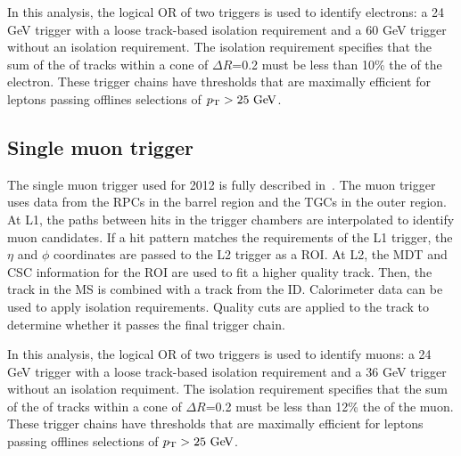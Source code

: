 In this analysis, the logical OR of two triggers is used to identify electrons: a 24 GeV trigger with a loose track-based isolation requirement and a 60 GeV trigger without an isolation requirement. The isolation requirement specifies that the sum of the \pt of tracks within a cone of $\Delta R$=0.2 must be less than 10\% the \pt of the electron. These trigger chains have thresholds that are maximally efficient for leptons passing offlines selections of $\pT > 25 \GeV$.

\subsection{Single muon trigger}

The single muon trigger used for 2012 is fully described in~\cite{mutrig}. The muon trigger uses data from the RPCs in the barrel region and the TGCs in the outer region. At L1, the paths between hits in the trigger chambers are interpolated to identify muon candidates. If a hit pattern matches the requirements of the L1 trigger, the $\eta$ and $\phi$ coordinates are passed to the L2 trigger as a ROI. At L2, the MDT and CSC information for the ROI are used to fit a higher quality track. Then, the track in the MS is combined with a track from the ID. Calorimeter data can be used to apply isolation requirements. Quality cuts are applied to the track to determine whether it passes the final trigger chain.

In this analysis, the logical OR of two triggers is used to identify muons: a 24 GeV trigger with a loose track-based isolation requirement and a 36 GeV trigger without an isolation requiment. The isolation requirement specifies that the sum of the \pt of tracks within a cone of $\Delta R$=0.2 must be less than 12\% the \pt of the muon. These trigger chains have thresholds that are maximally efficient for leptons passing offlines selections of $\pT > 25 \GeV$.


